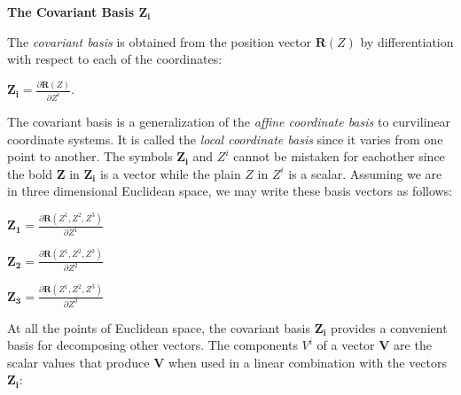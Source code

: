 \documentclass[12pt, a4paper]{article}
\begin{document}
\vspace{8mm}

\begin{flushleft}
    \textbf{The Covariant Basis $\mathbf{Z_i}$}
\end{flushleft}

    The \textit{covariant basis} is obtained from the position vector $\mathbf{R}(Z)$ by differentiation with respect to each of the coordinates:\par

\vspace{4mm}

        \centerline{\Large{$\mathbf{Z_i}=\frac{\partial\mathbf{R}(Z)}{\partial Z^i}$}.}
        
\vspace{4mm}

    The covariant basis is a generalization of the \textit{affine coordinate basis} to curvilinear coordinate systems. It is called the \textit{local coordinate basis} since it varies from one point to another. The symbols $\mathbf{Z_i}$ and $Z^i$ cannot be mistaken for eachother since the bold $\mathbf{Z}$ in $\mathbf{Z_i}$ is a vector while the plain $Z$ in $Z^i$ is a scalar. Assuming we are in three dimensional Euclidean space, we may write these basis vectors as follows:\par
    
\vspace{8mm}

        \centerline{\Large{$\mathbf{Z_1}=\frac{\partial\mathbf{R}(Z^1,Z^2,Z^3)}{\partial Z^1}$}}
        
\vspace{2mm}

        \centerline{\Large{$\mathbf{Z_2}=\frac{\partial\mathbf{R}(Z^1,Z^2,Z^3)}{\partial Z^2}$}}
        
\vspace{2mm}

        \centerline{\Large{$\mathbf{Z_3}=\frac{\partial\mathbf{R}(Z^1,Z^2,Z^3)}{\partial Z^3}$}}
        
\vspace{8mm}

    At all the points of Euclidean space, the covariant basis $\mathbf{Z_i}$ provides a convenient basis for decomposing other vectors. The components $V^i$ of a vector $\mathbf{V}$ are the scalar values that produce $\mathbf{V}$ when used in a linear combination with the vectors $\mathbf{Z_i}$:\par
    
\end{document}
